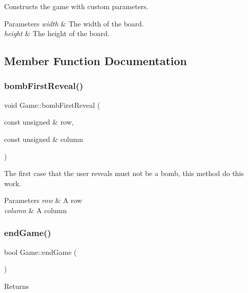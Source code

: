 Constructs the game with custom parameters. 


\begin{DoxyParams}{Parameters}
{\em width} & The width of the board. \\
\hline
{\em height} & The height of the board. \\
\hline
\end{DoxyParams}


\subsection{Member Function Documentation}
\mbox{\label{class_game_adcbcc007e6a362957ed347373285206b}} 
\subsubsection{\texorpdfstring{bomb\+First\+Reveal()}{bombFirstReveal()}}
{\footnotesize\ttfamily void Game\+::bomb\+First\+Reveal (\begin{DoxyParamCaption}\item[{const unsigned \&}]{row,  }\item[{const unsigned \&}]{column }\end{DoxyParamCaption})}



The first case that the user reveals must not be a bomb, this method do this work. 


\begin{DoxyParams}{Parameters}
{\em row} & A row \\
\hline
{\em column} & A column \\
\hline
\end{DoxyParams}
\mbox{\label{class_game_a82206afb0164fe775b2738236098caa6}} 
\subsubsection{\texorpdfstring{end\+Game()}{endGame()}}
{\footnotesize\ttfamily bool Game\+::end\+Game (\begin{DoxyParamCaption}{ }\end{DoxyParamCaption})}

\begin{DoxyReturn}{Returns}

\end{DoxyReturn}
\mbox{\label{class_game_aa57c57fa12655c4a877e06a291d215fc}} 
